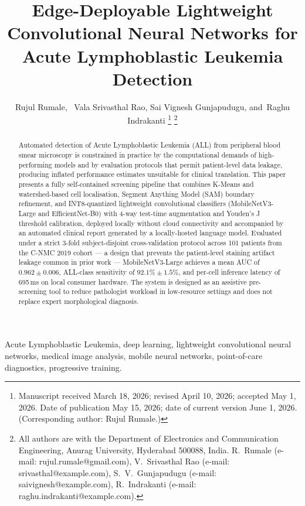 \documentclass[journal,twoside,web]{ieeecolor}
\begin{document}
\title{Edge-Deployable Lightweight Convolutional Neural Networks for Acute Lymphoblastic Leukemia Detection}
\author{Rujul Rumale,~
        Vala Srivasthal Rao,
        Sai Vignesh Gunjapudugu,
        and~Raghu Indrakanti
\thanks{Manuscript received March 18, 2026; revised April 10, 2026; accepted May 1, 2026. Date of publication May 15, 2026; date of current version June 1, 2026. (Corresponding author: Rujul Rumale.)}
\thanks{All authors are with the Department of Electronics and Communication Engineering, Anurag University, Hyderabad 500088, India.
R.~Rumale (e-mail: rujul.rumale@gmail.com),
V.~Srivasthal Rao (e-mail: srivasthal@example.com),
S.~V.~Gunjapudugu (e-mail: saivignesh@example.com),
R.~Indrakanti (e-mail: raghu.indrakanti@example.com).}}

\maketitle

\begin{abstract}
Automated detection of Acute Lymphoblastic Leukemia (ALL) from peripheral blood smear microscopy is constrained in practice by the computational demands of high-performing models and by evaluation protocols that permit patient-level data leakage, producing inflated performance estimates unsuitable for clinical translation. This paper presents a fully self-contained screening pipeline that combines K-Means and watershed-based cell localisation, Segment Anything Model (SAM) boundary refinement, and INT8-quantized lightweight convolutional classifiers (MobileNetV3-Large and EfficientNet-B0) with 4-way test-time augmentation and Youden's J threshold calibration, deployed locally without cloud connectivity and accompanied by an automated clinical report generated by a locally-hosted language model. Evaluated under a strict 3-fold subject-disjoint cross-validation protocol across 101 patients from the C-NMC 2019 cohort --- a design that prevents the patient-level staining artifact leakage common in prior work --- MobileNetV3-Large achieves a mean AUC of $0.962 \pm 0.006$, ALL-class sensitivity of $92.1\% \pm 1.5\%$, and per-cell inference latency of 695\,ms on local consumer hardware. The system is designed as an assistive pre-screening tool to reduce pathologist workload in low-resource settings and does not replace expert morphological diagnosis.
\end{abstract}

\begin{IEEEkeywords}
Acute Lymphoblastic Leukemia, deep learning, lightweight convolutional neural networks, medical image analysis, mobile neural networks, point-of-care diagnostics, progressive training.
\end{IEEEkeywords}
\end{document}
